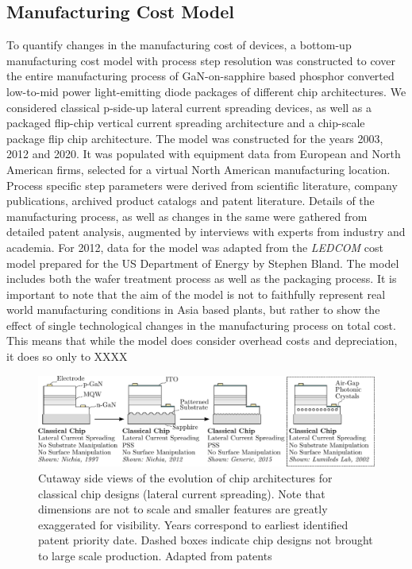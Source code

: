 \documentclass[a4paper,nocompress]{spie}  %
\begin{document}
    \subsection{Manufacturing Cost Model}
To quantify changes in the manufacturing cost of devices, a bottom-up manufacturing cost model with process step resolution was constructed to cover the entire manufacturing process of GaN-on-sapphire based phosphor converted low-to-mid power light-emitting diode packages of different chip architectures. We considered classical p-side-up lateral current spreading devices, as well as a packaged flip-chip vertical current spreading architecture and a chip-scale package flip chip architecture. The model was constructed for the years 2003, 2012 and 2020. It was populated with equipment data from European and North American firms, selected for a virtual North American manufacturing location. Process specific step parameters were derived from scientific literature, company publications, archived product catalogs and patent literature. Details of the manufacturing process, as well as changes in the same were gathered from detailed patent analysis, augmented by interviews with experts from industry and academia. For 2012, data for the model was adapted from the \textit{LEDCOM} cost model prepared for the US Department of Energy by Stephen Bland. The model includes both the wafer treatment process as well as the packaging process. It is important to note that the aim of the model is not to faithfully represent real world manufacturing conditions in Asia based plants, but rather to show the effect of single technological changes in the manufacturing process on total cost. This means that while the model does consider overhead costs and depreciation, it does so only to XXXX 


\begin{figure} [ht]
    \begin{center}
        \includegraphics[width=\textwidth]{SPIE/article/chip_architectures.pdf}
    \end{center}
    \caption{Cutaway side views of the evolution of chip architectures for classical chip designs (lateral current spreading). Note that dimensions are not to scale and smaller features are greatly exaggerated for visibility. Years correspond to earliest identified patent priority date. Dashed boxes indicate chip designs not brought to large scale production. Adapted from patents \cite{nagahama2013nitride,tanaka2010semiconductor,wierer2006photonic}}
    \label{fig:chip_arch}
\end{figure}
\end{document}
